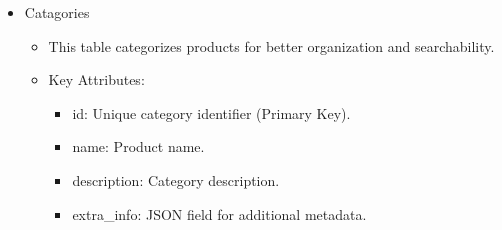 \documentclass{llncs}
\begin{document}
\begin{enumerate}
\begin{itemize}
              \item Catagories
                    \begin{itemize}
                        \item This table categorizes products for better organization and searchability.
                        \item Key Attributes:
                              \begin{itemize}
                                  \item id: Unique category identifier (Primary Key).
                                  \item name: Product name.
                                  \item description: Category description.
                                  \item extra\_info: JSON field for additional metadata.
                              \end{itemize}
                    \end{itemize}
          \end{itemize}



\end{enumerate}
\end{document}
